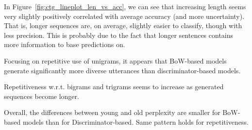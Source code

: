 In Figure~\ref{fig:ctg_lineplot_len_vs_acc}, we can see that increasing length seems very slightly positively correlated with average accuracy (and more uncertainty). That is, longer sequences are, on average, slightly easier to classify, though with less precision. This is probably due to the fact that longer sentences contains more information to base predictions on.

Focusing on repetitive use of unigrams, it appears that BoW-based models generate significantly more diverse utterances than discriminator-based models. 

Repetitiveness w.r.t. bigrams and trigrams seems to increase as generated sequences become longer.

Overall, the differences between young and old perplexity are smaller for BoW-based models than for Discriminator-based. Same pattern holds for repetitiveness.




